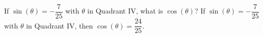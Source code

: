 {If $\sin(\theta) = -\dfrac{7}{25}$ with $\theta$ in Quadrant IV, what is $\cos(\theta)$? }
{If $\sin(\theta) = -\dfrac{7}{25}$ with $\theta$ in Quadrant IV, then $\cos(\theta) = \dfrac{24}{25}$.}